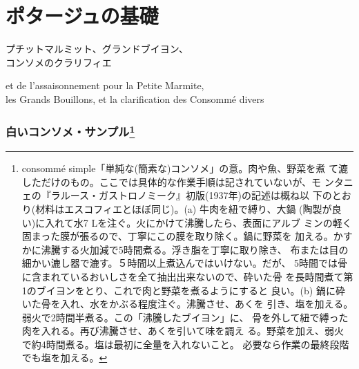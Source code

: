 \href{原稿下準備20180414五島、連載からコピー}{} \href{訳と注釈}{}
\href{未、原文対照チェック}{} \href{未、日本語表現校正}{}
\href{未、その他修正}{} \href{未、原稿最終校正}{}

\hypertarget{ux30ddux30bfux30fcux30b8ux30e5ux306eux57faux790e}{%
\section{ポタージュの基礎}\label{ux30ddux30bfux30fcux30b8ux30e5ux306eux57faux790e}}

\vspace{-.5\zw}
\begin{center}
\headfont\medlarge プチットマルミット、グランドブイヨン、\\コンソメのクラリフィエ \normalfont\normalsize
\end{center}
\vspace{2ex}
\vspace{-1ex}
\begin{center}
\headfont et de l'assaisonnement pour la Petite Marmite,\\ les Grands Bouillons,
et la clarification des Consommé divers

\end{center}
\normalfont
{}

\hypertarget{ux767dux3044ux30b3ux30f3ux30bdux30e1ux30b5ux30f3ux30d7ux30eb1}{%
\subsubsection[白いコンソメ・サンプル]{\texorpdfstring{白いコンソメ・サンプル\footnote{consommé
  simple「単純な(簡素な)コンソメ」の意。肉や魚、野菜を煮
  て漉しただけのもの。ここでは具体的な作業手順は記されていないが、モ
  ンタニェの『ラルース・ガストロノミーク』初版(1937年)の記述は概ね以
  下のとおり(材料はエスコフィエとほぼ同じ)。(a) 牛肉を紐で縛り、大鍋
  (陶製が良い)に入れて水7 Lを注ぐ。火にかけて沸騰したら、表面にアルブ
  ミンの軽く固まった膜が張るので、丁寧にこの膜を取り除く。鍋に野菜を
  加える。かすかに沸騰する火加減で5時間煮る。浮き脂を丁寧に取り除き、
  布または目の細かい漉し器で漉す。５時間以上煮込んではいけない。だが、
  5時間では骨に含まれているおいしさを全て抽出出来ないので、砕いた骨
  を長時間煮て第1のブイヨンをとり、これで肉と野菜を煮るようにすると
  良い。(b) 鍋に砕いた骨を入れ、水をかぶる程度注ぐ。沸騰させ、あくを
  引き、塩を加える。弱火で2時間半煮る。この「沸騰したブイヨン」に、
  骨を外して紐で縛った肉を入れる。再び沸騰させ、あくを引いて味を調え
  る。野菜を加え、弱火で約4時間煮る。塩は最初に全量を入れないこと。
  必要なら作業の最終段階でも塩を加える。}}{白いコンソメ・サンプル}}\label{ux767dux3044ux30b3ux30f3ux30bdux30e1ux30b5ux30f3ux30d7ux30eb1}}

